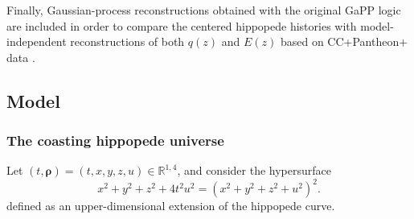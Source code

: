 \documentclass[preprint,12pt]{elsarticle}
\renewcommand{\vec}[1]{\boldsymbol{#1}}
\begin{document}
Finally, Gaussian-process reconstructions obtained with the original GaPP logic are included in order to compare the centered hippopede histories with model-independent reconstructions of both $q(z)$ and $E(z)$ based on CC+Pantheon$+$ data \cite{seikel2012gapp}.



\subsection{Model}

\subsubsection{The coasting hippopede universe}

Let $(t, \vec \rho) = (t,x,y,z,u)\in\mathbb{R}^{1,4}$, and consider the hypersurface
\begin{equation}
\label{eq:hippopede_univ}
 x^2 + y^2 + z^2 + 4t^2 u^2 = (x^2 + y^2 + z^2 + u^2)^2 .
\end{equation}
defined as an upper-dimensional extension of the hippopede curve.
\end{document}
